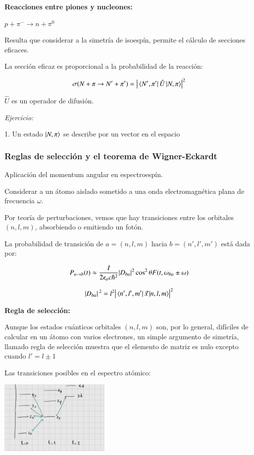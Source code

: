 \textbf{Reacciones entre piones y nucleones:}

$p+\pi^-\rightarrow n +\pi^0$

Resulta que considerar a la simetría de isoespín, permite el cálculo de secciones eficaces.

La sección eficaz es proporcional a la probabilidad de la reacción:

\begin{align*}
    \sigma(N+\pi\rightarrow N'+\pi')=\abs{\bra*{N',\pi'}\hat{U}\ket*{N,\pi}}^2
\end{align*}

$\hat{U}$ es un operador de difusión.

\textit{Ejercicio:}

1. Un estado $\ket{N,\pi}$ se describe por un vector en el espacio 



\subsubsection{Reglas de selección y el teorema de Wigner-Eckardt}
Aplicación del momentum angular en espectroespín.

Considerar a un átomo aislado sometido a una onda electromagnética plana de frecuencia $\omega$.

Por teoría de perturbaciones, vemos que hay transiciones entre los orbitales $(n,l,m)$, absorbiendo o emitiendo un fotón.

La probabilidad de transición de $a=(n,l,m)$ hacia $b=(n',l',m')$ está dada por:

\begin{align*}
    P_{a\rightarrow b}(t)\approx \frac{I}{2\epsilon_oc\hbar^2}\abs{D_{ba}}^2\cos^2\theta F(t,\omega_{ba}\pm \omega)
\end{align*}

\begin{align*}
    \abs*{D_{ba}}^2= l^2\abs{\bra*{n',l',m'}\vec{x}\ket{n,l,m}}^2
\end{align*}

\textbf{Regla de selección:}

Aunque los estados cuánticos orbitales $(n,l,m)$ son, por lo general, difíciles de calcular en un átomo con varios electrones,
un simple argumento de simetría, llamado regla de selección muestra que el elemento de matriz es nulo excepto cuando $l'=l\pm 1$

Las transiciones posibles en el espectro atómico:

\includegraphics[width=0.4\textwidth]{Graficas/Aug19-1.png}

